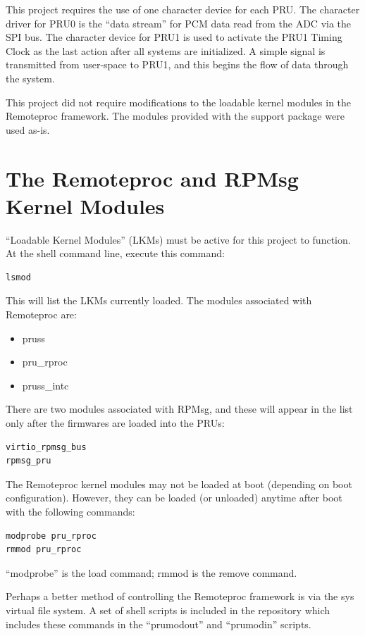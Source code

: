 This project requires the use of one character device for each PRU.  The character driver for PRU0 is the ``data stream'' for PCM data read from the ADC via the SPI bus.  The character device for PRU1 is used to activate the PRU1 Timing Clock as the last action after all systems are initialized.  A simple signal is transmitted from user-space to PRU1, and this begins the flow of data through the system.

This project did not require modifications to the loadable kernel modules in the Remoteproc framework.  The modules provided with the support package were used as-is.

\section{The Remoteproc and RPMsg Kernel Modules}

``Loadable Kernel Modules'' (LKMs) must be active for this project to function.
At the shell command line, execute this command:

\begin{verbatim}
lsmod
\end{verbatim}

This will list the LKMs currently loaded.  The modules associated with Remoteproc are:

\begin{itemize}
\item pruss
\item pru\_rproc
\item pruss\_intc
\end{itemize}

There are two modules associated with RPMsg, and these will appear in the list only after the firmwares are loaded into the PRUs:

\begin{verbatim}
virtio_rpmsg_bus
rpmsg_pru
\end{verbatim}

The Remoteproc kernel modules may not be loaded at boot (depending on boot configuration).  However, they can be loaded (or unloaded) anytime after boot with the following commands:

\begin{verbatim}
modprobe pru_rproc
rmmod pru_rproc
\end{verbatim}

``modprobe'' is the load command; rmmod is the remove command.

Perhaps a better method of controlling the Remoteproc framework is via the sys virtual file system.  A set of shell scripts is included in the repository which includes these commands in the ``prumodout'' and ``prumodin'' scripts.


